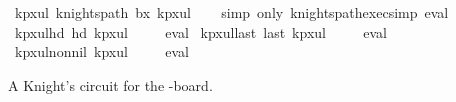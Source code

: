 \begin{isabellebody}
\isanewline
{}\isamarkupfalse%
\ kp{\isacharunderscore}{\kern0pt}{}x{}{\isacharunderscore}{\kern0pt}ul{\isacharcolon}{\kern0pt}\ {\isachardoublequoteopen}knights{\isacharunderscore}{\kern0pt}path\ b{}x{}\ kp{}x{}ul{\isachardoublequoteclose}\isanewline
%
\isadelimproof
\ \ %
\endisadelimproof
%
\isatagproof
{}\isamarkupfalse%
\ {\isacharparenleft}{\kern0pt}simp\ only{\isacharcolon}{\kern0pt}\ knights{\isacharunderscore}{\kern0pt}path{\isacharunderscore}{\kern0pt}exec{\isacharunderscore}{\kern0pt}simp{\isacharparenright}{\kern0pt}\ eval%
\endisatagproof
{\isafoldproof}%
%
\isadelimproof
\isanewline
%
\endisadelimproof
\isanewline
{}\isamarkupfalse%
\ kp{\isacharunderscore}{\kern0pt}{}x{}{\isacharunderscore}{\kern0pt}ul{\isacharunderscore}{\kern0pt}hd{\isacharcolon}{\kern0pt}\ {\isachardoublequoteopen}hd\ kp{}x{}ul\ {\isacharequal}{\kern0pt}\ {\isacharparenleft}{\kern0pt}{}{\isacharcomma}{\kern0pt}{}{\isacharparenright}{\kern0pt}{\isachardoublequoteclose}%
\isadelimproof
\ %
\endisadelimproof
%
\isatagproof
{}\isamarkupfalse%
\ eval%
\endisatagproof
{\isafoldproof}%
%
\isadelimproof
%
\endisadelimproof
\isanewline
\isanewline
{}\isamarkupfalse%
\ kp{\isacharunderscore}{\kern0pt}{}x{}{\isacharunderscore}{\kern0pt}ul{\isacharunderscore}{\kern0pt}last{\isacharcolon}{\kern0pt}\ {\isachardoublequoteopen}last\ kp{}x{}ul\ {\isacharequal}{\kern0pt}\ {\isacharparenleft}{\kern0pt}{}{\isacharcomma}{\kern0pt}{}{\isacharparenright}{\kern0pt}{\isachardoublequoteclose}%
\isadelimproof
\ %
\endisadelimproof
%
\isatagproof
{}\isamarkupfalse%
\ eval%
\endisatagproof
{\isafoldproof}%
%
\isadelimproof
%
\endisadelimproof
\isanewline
\isanewline
{}\isamarkupfalse%
\ kp{\isacharunderscore}{\kern0pt}{}x{}{\isacharunderscore}{\kern0pt}ul{\isacharunderscore}{\kern0pt}non{\isacharunderscore}{\kern0pt}nil{\isacharcolon}{\kern0pt}\ {\isachardoublequoteopen}kp{}x{}ul\ {\isasymnoteq}\ {\isacharbrackleft}{\kern0pt}{\isacharbrackright}{\kern0pt}{\isachardoublequoteclose}%
\isadelimproof
\ %
\endisadelimproof
%
\isatagproof
{}\isamarkupfalse%
\ eval%
\endisatagproof
{\isafoldproof}%
%
\isadelimproof
%
\endisadelimproof
%
\begin{isamarkuptext}%
A Knight's circuit for the -board.

\end{isamarkuptext}
\end{isabellebody}
